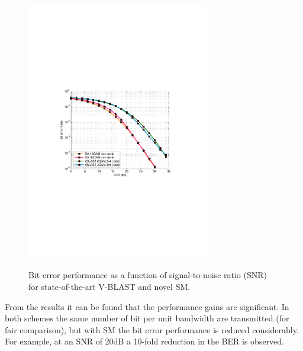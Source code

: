 \begin{figure}[!!htp]\centering
  \includegraphics[width=8cm]{haas_2.pdf}\\
  \caption{Bit error performance as a function of signal-to-noise ratio (SNR) for state-of-the-art V-BLAST and novel SM.}
  \label{fig55}
\end{figure}
From the results it can be found that the performance gains are
significant. In both schemes the same number of bit per unit
bandwidth are transmitted (for fair comparison), but with SM the bit
error performance is reduced considerably. For example, at an SNR of
20dB a 10-fold reduction in the BER is observed.

